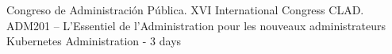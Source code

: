 
\begin{scholarship}
			{Congreso de Administración Pública. XVI International Congress CLAD.}
			{ADM201 – L’Essentiel de l’Administration pour les nouveaux administrateurs}
			{Kubernetes Administration - 3 days}
\end{scholarship}
